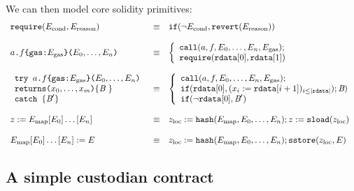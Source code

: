\documentclass[12pt]{extarticle}
\begin{document}
We can then model core solidity primitives:
$$\begin{array}{lll}
\texttt{require}(E_\textrm{cond},E_\textrm{reason}) &\equiv& \mathtt{if}(\neg E_\textrm{cond},\mathtt{revert}(E_\textrm{reason}))\\\\
\texttt{$a$.$f$\{gas:$E_\textrm{gas}$\}($E_0,\dots,E_n$)} &\equiv& \left\{
\begin{array}{l}
    \mathtt{call}(a,f,E_0,\dots,E_n,E_\textrm{gas}); \\
    \texttt{require}(\mathtt{rdata}[0],\mathtt{rdata}[1])
\end{array}\right. \\\\
\begin{array}{l}
\texttt{try $a$.$f$\{gas:$E_\textrm{gas}$\}($E_0,\dots,E_n$)}\\
\texttt{returns($x_0,\dots,x_m$)}\{\textit{B}\ \}\\
\texttt{catch } \{\textit{B}'\} \end{array} &\equiv& \left\{
    \begin{array}{l}
        \mathtt{call}(a,f,E_0,\dots,E_n,E_\textrm{gas}); \\
        \mathtt{if}(\mathtt{rdata}[0], (x_i:=\mathtt{rdata}[i+1])_{i\leq |\mathtt{rdata}|});\textit{B}) \\
        \mathtt{if}(\neg\mathtt{rdata}[0], \textit{B}')
    \end{array}\right. \\\\
z:=E_{\rm map}[E_0]\dots[E_n] &\equiv& z_{\rm loc}:=\mathtt{hash}(E_{\rm map},E_0,\dots,E_n); z:=\mathtt{sload}(z_{\rm loc})\\\\
E_{\rm map}[E_0]\dots[E_n]:=E &\equiv& z_{\rm loc}:=\mathtt{hash}(E_{\rm map},E_0,\dots,E_n); \mathtt{sstore}(z_{\rm loc},E)
\end{array}
$$

\subsection{A simple custodian contract}\label{sec:ERC20}



\end{document}
